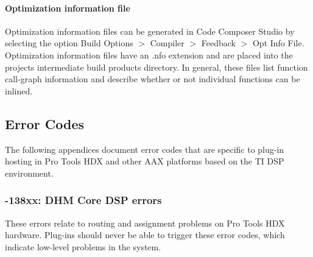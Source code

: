 \hypertarget{a00362_subsubsection__optimization_information_file_}{}\paragraph{Optimization information file}\label{a00362_subsubsection__optimization_information_file_}
 Optimization information files can be generated in Code Composer Studio by selecting the option Build Options $>$ Compiler $>$ Feedback $>$ Opt Info File. Optimization information files have an .nfo extension and are placed into the project\textquotesingle{}s intermediate build products directory. In general, these files list function call-\/graph information and describe whether or not individual functions can be inlined. 

 \hypertarget{a00362_aax_ti_guide_07_error_codes}{}\subsection{Error Codes}\label{a00362_aax_ti_guide_07_error_codes}
The following appendices document error codes that are specific to plug-\/in hosting in Pro Tools H\+D\+X and other A\+A\+X platforms based on the T\+I D\+S\+P environment.

\hypertarget{a00362_subsection__138xx_dhm_core_dsp_errors}{}\subsubsection{-\/138xx\+: D\+H\+M Core D\+S\+P errors}\label{a00362_subsection__138xx_dhm_core_dsp_errors}
 These errors relate to routing and assignment problems on Pro Tools H\+D\+X hardware. Plug-\/ins should never be able to trigger these error codes, which indicate low-\/level problems in the system.

